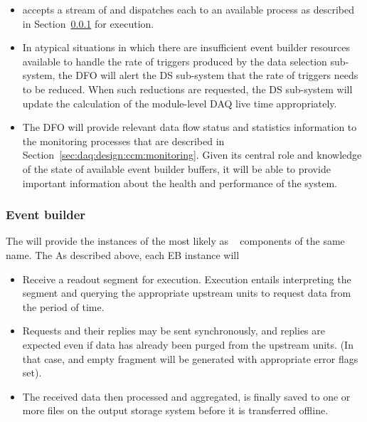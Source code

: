\begin{itemize}
\item {} accepts a stream of  and dispatches each to an available  process as described in Section~\ref{sec:fd-daq:design-event-builder} for execution.
\item In atypical situations in which there are insufficient event builder resources available to handle the rate of triggers produced by the data selection sub-system, the DFO will alert the DS sub-system that the rate of triggers needs to be reduced.  When such reductions are requested, the DS sub-system will update the calculation of the module-level DAQ live time appropriately.
\item The DFO will provide relevant data flow status and statistics information to the monitoring processes that are described in Section~\ref{sec:daq:design:ccm:monitoring}. Given its central role and knowledge of the state of available event builder buffers, it will be able to provide important information about the health and performance of the system.
\end{itemize}

\subsubsection{Event builder}
\label{sec:fd-daq:design-event-builder}

The  will provide the instances of the  most likely as
~\cite{artdaq} components of the same name. The 
As described above, each EB instance will

\begin{itemize}
  \item Receive a readout segment for execution. Execution entails interpreting the  segment and querying the appropriate upstream  units to request data from the period of time. 
  \item Requests and their replies may be sent synchronously, and replies are expected even if data has already been purged from the upstream  units. (In that case, and empty fragment will be generated with appropriate error flags set).
  \item The received data then processed and aggregated, is finally saved to one or more files on the output storage system before it is transferred offline.
\end{itemize}


